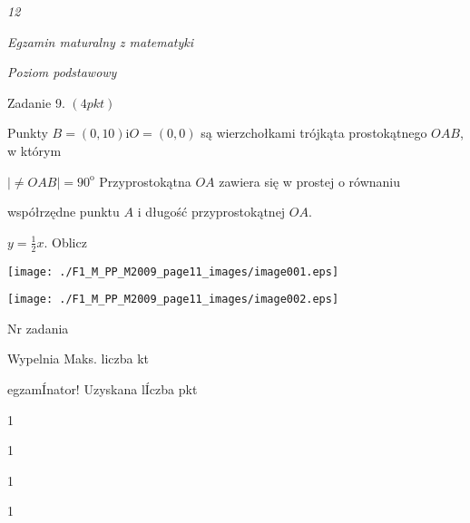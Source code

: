 \documentclass[a4paper,12pt]{article}
\begin{document}
{\it 12}

{\it Egzamin maturalny z matematyki}

{\it Poziom podstawowy}

Zadanie 9. $(4pkt)$

Punkty $B=(0,10) \mathrm{i} O=(0,0)$ są wierzchołkami trójkąta prostokątnego $OAB$, w którym

$|\neq OAB|=90^{\mathrm{o}}$ Przyprostokątna $OA$ zawiera się w prostej o równaniu

współrzędne punktu $A$ i długość przyprostokątnej $OA.$

$y=\displaystyle \frac{1}{2}x$. Oblicz
\begin{center}
\texttt{[image: ./F1\_M\_PP\_M2009\_page11\_images/image001.eps]}

\texttt{[image: ./F1\_M\_PP\_M2009\_page11\_images/image002.eps]}
\end{center}
Nr zadania

Wypelnia Maks. liczba kt

egzamÍnator! Uzyskana lÍczba pkt

1

1

1

1
\end{document}
